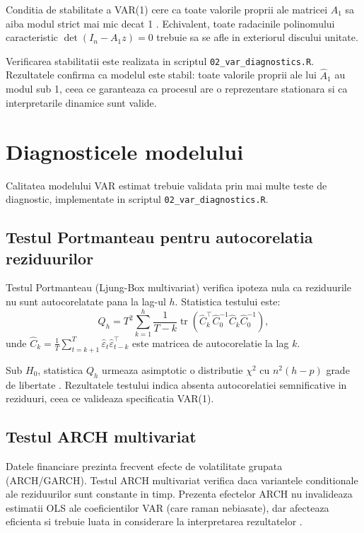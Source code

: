 Conditia de stabilitate a VAR(1) cere ca toate valorile proprii ale matricei
$A_1$ sa aiba modul strict mai mic decat 1 \citep{lutkepohl2005}. Echivalent, toate radacinile
polinomului caracteristic $\det(I_n - A_1 z) = 0$ trebuie sa se afle in
exteriorul discului unitate.

Verificarea stabilitatii este realizata in scriptul \texttt{02\_var\_diagnostics.R}.
Rezultatele confirma ca modelul este stabil: toate valorile proprii ale lui
$\hat{A}_1$ au modul sub 1, ceea ce garanteaza ca procesul are o reprezentare
stationara si ca interpretarile dinamice sunt valide.

\section{Diagnosticele modelului}

Calitatea modelului VAR estimat trebuie validata prin mai multe teste de
diagnostic, implementate in scriptul \texttt{02\_var\_diagnostics.R}.

\subsection{Testul Portmanteau pentru autocorelatia reziduurilor}

Testul Portmanteau (Ljung-Box multivariat) verifica ipoteza nula ca reziduurile
nu sunt autocorelatate pana la lag-ul $h$. Statistica testului este:
\begin{equation}
    Q_h = T^2 \sum_{k=1}^{h} \frac{1}{T-k}
    \operatorname{tr}\!\left(\hat{C}_k^\top \hat{C}_0^{-1} \hat{C}_k \hat{C}_0^{-1}\right),
    \label{eq:portmanteau}
\end{equation}
unde $\hat{C}_k = \frac{1}{T}\sum_{t=k+1}^T \hat{\varepsilon}_t \hat{\varepsilon}_{t-k}^\top$
este matricea de autocorelatie la lag $k$.

Sub $H_0$, statistica $Q_h$ urmeaza asimptotic o distributie $\chi^2$ cu
$n^2(h - p)$ grade de libertate \citep{lutkepohl2005}. Rezultatele testului
indica absenta autocorelatiei semnificative in reziduuri, ceea ce valideaza
specificatia VAR(1).

\subsection{Testul ARCH multivariat}

Datele financiare prezinta frecvent efecte de volatilitate grupata (ARCH/GARCH).
Testul ARCH multivariat verifica daca variantele conditionale ale reziduurilor
sunt constante in timp. Prezenta efectelor ARCH nu invalideaza estimatii OLS ale
coeficientilor VAR (care raman nebiasate), dar afecteaza eficienta si trebuie
luata in considerare la interpretarea rezultatelor \citep{tsay2010}.

